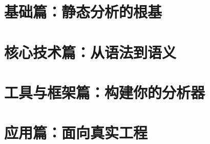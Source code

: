 \documentclass[11pt,a4paper,oneside]{book}
\begin{document}


\frontmatter
\pagestyle{plain}

\cleardoublepage
{\hypersetup{linkcolor=GoDark}
 \tableofcontents}
\cleardoublepage

\mainmatter
\pagestyle{fancy}

\part{基础篇：静态分析的根基}




\part{核心技术篇：从语法到语义}





\part{工具与框架篇：构建你的分析器}




\part{应用篇：面向真实工程}




\appendix


\backmatter
\printindex
\end{document}
